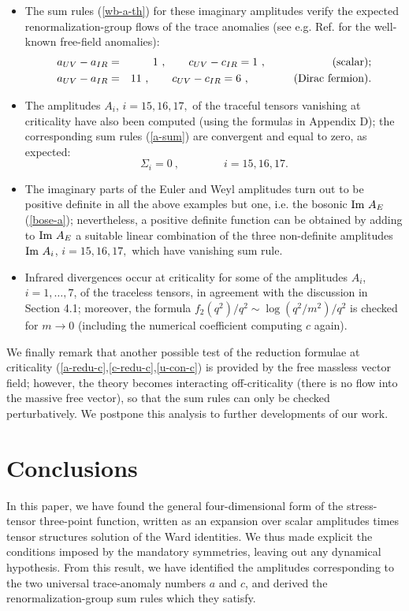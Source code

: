 \documentclass[11pt]{article}
\newcommand{\beq}{\begin{equation}}
\newcommand{\eeq}{\end{equation}}
\newcommand{\bea}{\begin{eqnarray}}
\newcommand{\eea}{\end{eqnarray}}
\def\Im{\hbox{\rm Im\ }}
\def\nl{\nonumber\\}
\begin{document}
\begin{itemize}
\item
The sum rules (\ref{wb-a-th}) for these imaginary amplitudes
verify the expected renormalization-group flows of the trace anomalies  
(see e.g. Ref.\cite{cfl} for the well-known free-field anomalies):
\bea
a_{UV}-a_{IR} &=& 1\ , \qquad c_{UV}-c_{IR} = 1\ , \qquad\qquad\qquad
(\rm scalar);
\nl
 a_{UV}-a_{IR} &=& 11\ , \qquad c_{UV}-c_{IR} = 6\ , \qquad\qquad
(\rm Dirac\ fermion).
\eea
\item
The amplitudes $A_i$, $i=15,16,17,$ of the traceful tensors vanishing at 
criticality have also been computed (using the formulas in Appendix D); 
the corresponding sum rules (\ref{a-sum})
are convergent and equal to zero, as expected:
\beq
\Sigma_i =0 \ , \qquad\qquad i=15,16,17.
\eeq
\item
The imaginary parts of the Euler and Weyl amplitudes turn out to be 
positive definite in all the above examples but one, i.e. the bosonic
$\Im A_E$ (\ref{bose-a}); nevertheless, a positive
definite function can be obtained by adding to
$\Im A_E$ a suitable linear combination of the three non-definite
amplitudes $\Im A_i$, $i=15,16,17,$ which have vanishing sum rule.
\item 
Infrared divergences occur at criticality
for some of the amplitudes $A_i$, $i=1,\dots,7$, of the traceless tensors,
in agreement with the discussion in Section 4.1; moreover, the formula 
$f_2(q^2)/q^2\sim \log(q^2/m^2)/q^2$ is checked for $m\to 0$
(including the numerical coefficient computing $c$ again).
\end{itemize}
We finally remark that another possible test of the reduction
formulae at criticality (\ref{a-redu-c},\ref{c-redu-c},\ref{u-con-c})
is provided by the free massless vector field;
however, the theory becomes interacting off-criticality 
(there is no flow into the massive free vector), so that
the sum rules can only be checked perturbatively.
We postpone this analysis to further developments of our work.



 
\section{Conclusions} 

In this paper, we have found the general four-dimensional form 
of the stress-tensor three-point function, written as an expansion
over scalar amplitudes times tensor structures solution
of the Ward identities. We thus made explicit the conditions imposed
by the mandatory symmetries, leaving out any dynamical
hypothesis. From this result, we have identified the amplitudes
corresponding to the two universal trace-anomaly numbers $a$ and $c$, and
derived the renormalization-group sum rules which they satisfy.
\end{document}
